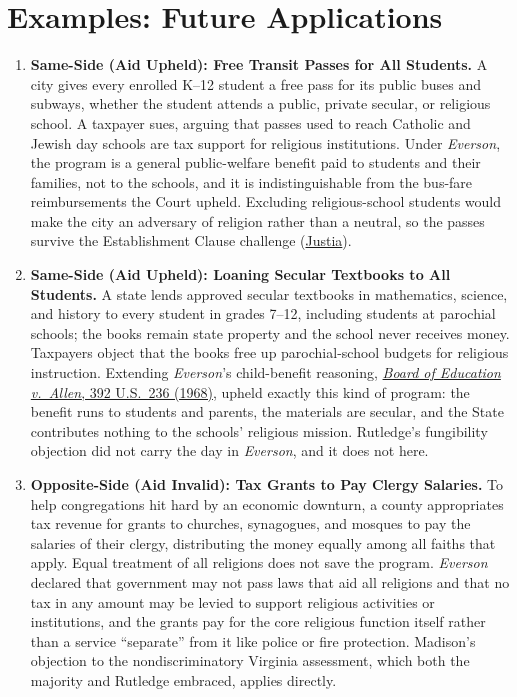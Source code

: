 \documentclass[12pt]{article}
\begin{document}
\section{Examples: Future Applications}
\begin{enumerate}

\item \textbf{Same-Side (Aid Upheld): Free Transit Passes for All Students.} A city gives every enrolled K--12 student a free pass for its public buses and subways, whether the student attends a public, private secular, or religious school. A taxpayer sues, arguing that passes used to reach Catholic and Jewish day schools are tax support for religious institutions. Under \textit{Everson}, the program is a general public-welfare benefit paid to students and their families, not to the schools, and it is indistinguishable from the bus-fare reimbursements the Court upheld. Excluding religious-school students would make the city an adversary of religion rather than a neutral, so the passes survive the Establishment Clause challenge (\href{https://supreme.justia.com/cases/federal/us/330/1/}{Justia}).

\item \textbf{Same-Side (Aid Upheld): Loaning Secular Textbooks to All Students.} A state lends approved secular textbooks in mathematics, science, and history to every student in grades 7--12, including students at parochial schools; the books remain state property and the school never receives money. Taxpayers object that the books free up parochial-school budgets for religious instruction. Extending \textit{Everson}'s child-benefit reasoning, \href{https://supreme.justia.com/cases/federal/us/392/236/}{\textit{Board of Education v.\ Allen}, 392 U.S.\ 236 (1968)}, upheld exactly this kind of program: the benefit runs to students and parents, the materials are secular, and the State contributes nothing to the schools' religious mission. Rutledge's fungibility objection did not carry the day in \textit{Everson}, and it does not here.

\item \textbf{Opposite-Side (Aid Invalid): Tax Grants to Pay Clergy Salaries.} To help congregations hit hard by an economic downturn, a county appropriates tax revenue for grants to churches, synagogues, and mosques to pay the salaries of their clergy, distributing the money equally among all faiths that apply. Equal treatment of all religions does not save the program. \textit{Everson} declared that government may not pass laws that aid all religions and that no tax in any amount may be levied to support religious activities or institutions, and the grants pay for the core religious function itself rather than a service ``separate'' from it like police or fire protection. Madison's objection to the nondiscriminatory Virginia assessment, which both the majority and Rutledge embraced, applies directly.


\end{enumerate}
\end{document}
